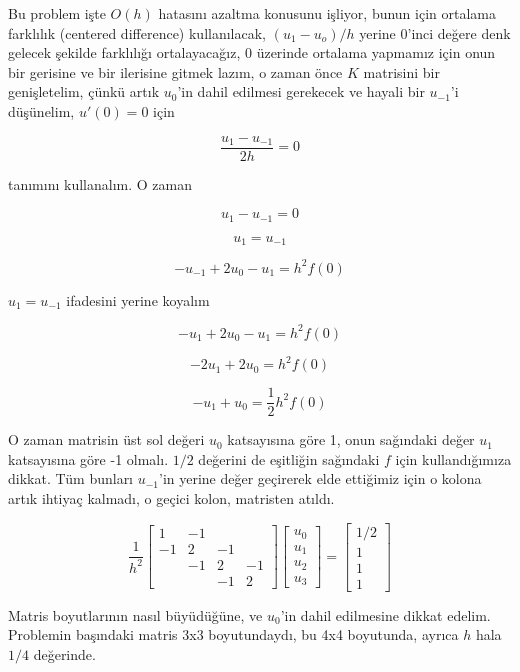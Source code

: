 \documentclass[12pt,fleqn]{article}\usepackage{../../common}
\begin{document}
Bu problem işte $O(h)$ hatasını azaltma konusunu işliyor, bunun için ortalama
farklılık (centered difference) kullanılacak, $(u_1 - u_o)/h$ yerine 0'inci
değere denk gelecek şekilde farklılığı ortalayacağız, 0 üzerinde ortalama
yapmamız için onun bir gerisine ve bir ilerisine gitmek lazım, o zaman önce $K$
matrisini bir genişletelim, çünkü artık $u_0$'in dahil edilmesi gerekecek ve
hayali bir $u_{-1}$'i düşünelim, $u'(0) = 0$ için

$$ \frac{u_1-u_{-1}}{2h} = 0$$

tanımını kullanalım. O zaman

$$ u_1 - u_{-1} = 0$$

$$ u_1 =  u_{-1} $$

$$ -u_{-1} + 2u_0 - u_1 = h^2 f(0) $$

$u_1 =  u_{-1}$ ifadesini yerine koyalım

$$ -u_1 + 2u_0 - u_1 = h^2 f(0) $$

$$ -2u_1 + 2u_0 = h^2 f(0) $$

$$ -u_1 + u_0 = \frac{1}{2} h^2 f(0) $$

O zaman matrisin üst sol değeri $u_0$ katsayısına göre 1, onun sağındaki
değer $u_1$ katsayısına göre -1 olmalı. $1/2$ değerini de eşitliğin
sağındaki $f$ için kullandığımıza dikkat. Tüm bunları $u_{-1}$'in yerine
değer geçirerek elde ettiğimiz için o kolona artık ihtiyaç kalmadı, o
geçici kolon, matristen atıldı. 

$$ \frac{1}{h^2}
\left[\begin{array}{rrrr}
1 & -1 & & \\
-1 & 2 & -1 & \\
& -1 & 2 & -1 \\
 & & -1 & 2
\end{array}\right]
\left[\begin{array}{r}
u_0 \\
u_1 \\
u_2 \\
u_3 
\end{array}\right] 
=
\left[\begin{array}{r}
1/2 \\
1 \\
1 \\
1 
\end{array}\right]
 $$

Matris boyutlarının nasıl büyüdüğüne, ve $u_0$'in dahil edilmesine dikkat
edelim. Problemin başındaki matris 3x3 boyutundaydı, bu 4x4 boyutunda,
ayrıca $h$ hala $1/4$ değerinde. 
\end{document}

